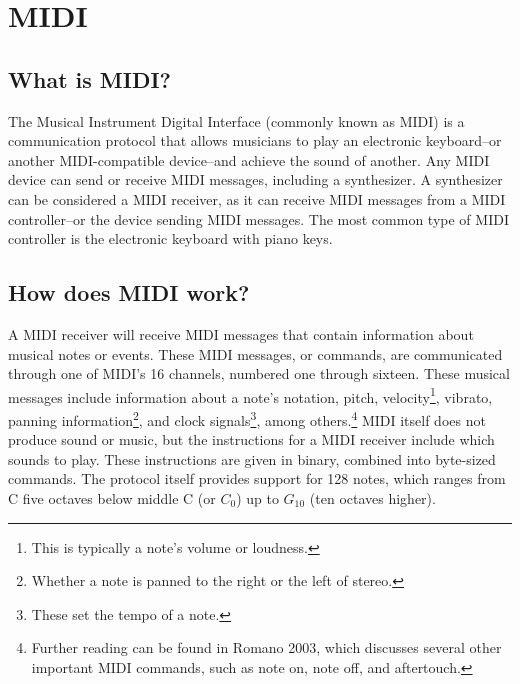 \section[MIDI: An Introduction]{MIDI}\label{section:midi}

\subsection[What is MIDI?]{What is MIDI?}\label{section:what-midi}

The Musical Instrument Digital Interface (commonly known as MIDI) is a communication protocol that allows musicians to play an electronic keyboard--or another MIDI-compatible device--and achieve the sound of another. Any MIDI device can send or receive MIDI messages, including a synthesizer. A synthesizer can be considered a MIDI receiver, as it can receive MIDI messages from a MIDI controller--or the device sending MIDI messages. The most common type of MIDI controller is the electronic keyboard with piano keys.

\subsection[How does MIDI work?]{How does MIDI work?}\label{section:how-midi}

A MIDI receiver will receive MIDI messages that contain information about musical notes or events. These MIDI messages, or commands, are communicated through one of MIDI's 16 channels, numbered one through sixteen. These musical messages include information about a note's notation, pitch, velocity\footnote{This is typically a note's volume or loudness.}, vibrato, panning information\footnote{Whether a note is panned to the right or the left of stereo.}, and clock signals\footnote{These set the tempo of a note.}, among others.\footnote{Further reading can be found in Romano 2003, which discusses several other important MIDI commands, such as note on, note off, and aftertouch.} MIDI itself does not produce sound or music, but the instructions for a MIDI receiver include which sounds to play. These instructions are given in binary, combined into byte-sized commands. The protocol itself provides support for 128 notes, which ranges from C five octaves below middle C (or $C_0$) up to $G_{10}$ (ten octaves higher).